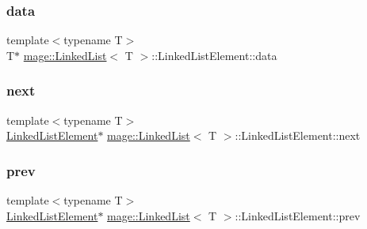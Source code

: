 \subsubsection{\texorpdfstring{data}{data}}
{\footnotesize\ttfamily template$<$typename T$>$ \\
T$\ast$ \hyperlink{classmage_1_1_linked_list}{mage\+::\+Linked\+List}$<$ T $>$\+::Linked\+List\+Element\+::data}

\hypertarget{structmage_1_1_linked_list_1_1_linked_list_element_a379ce1f54d7a044cdfd97595460ac602}{}\label{structmage_1_1_linked_list_1_1_linked_list_element_a379ce1f54d7a044cdfd97595460ac602} 
\subsubsection{\texorpdfstring{next}{next}}
{\footnotesize\ttfamily template$<$typename T$>$ \\
\hyperlink{structmage_1_1_linked_list_1_1_linked_list_element}{Linked\+List\+Element}$\ast$ \hyperlink{classmage_1_1_linked_list}{mage\+::\+Linked\+List}$<$ T $>$\+::Linked\+List\+Element\+::next}

\hypertarget{structmage_1_1_linked_list_1_1_linked_list_element_a6aa1a290fa0c06efae90730220bb4c57}{}\label{structmage_1_1_linked_list_1_1_linked_list_element_a6aa1a290fa0c06efae90730220bb4c57} 
\subsubsection{\texorpdfstring{prev}{prev}}
{\footnotesize\ttfamily template$<$typename T$>$ \\
\hyperlink{structmage_1_1_linked_list_1_1_linked_list_element}{Linked\+List\+Element}$\ast$ \hyperlink{classmage_1_1_linked_list}{mage\+::\+Linked\+List}$<$ T $>$\+::Linked\+List\+Element\+::prev}

